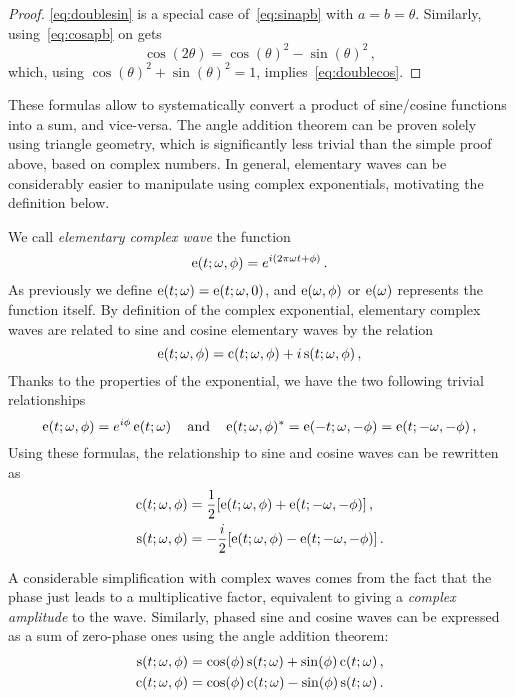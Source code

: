 \begin{proof}
  \cref{eq:doublesin} is a special case of~\cref{eq:sinapb} with $a=b=\theta$. Similarly,
  using~\cref{eq:cosapb} on gets
  \begin{equation}
    \cos(2\theta)=\cos(\theta)^2-\sin(\theta)^2\,,
  \end{equation}
  which, using $\cos(\theta)^2+\sin(\theta)^2=1$, implies~\cref{eq:doublecos}.
\end{proof}
These formulas allow to systematically convert a product of sine/cosine
functions into a sum, and vice-versa. The angle addition theorem can be proven solely
using triangle geometry, which is significantly less trivial than the simple proof above,
based on complex numbers. In general, elementary waves can be considerably easier to manipulate using
complex exponentials, motivating the definition below.
\begin{definition}
  \label{def:complex-wave}
  We call \emph{elementary complex wave} the function
  \begin{equation}
    \operatorname{e}(t;\omega,\phi)=e^{i(2\pi\omega t + \phi)}\,.
  \end{equation}
  As previously we define $\operatorname{e}(t;\omega)=\operatorname{e}(t;\omega,0)$, and $\operatorname{e}(\omega,\phi)$ or
  $\operatorname{e}(\omega)$ represents the function itself. By definition of the complex exponential,
  elementary complex waves are related to sine and cosine elementary waves by the relation
  \begin{equation}
    \operatorname{e}(t;\omega,\phi)=\operatorname{c}(t;\omega,\phi)+i\operatorname{s}(t;\omega,\phi)\,,
  \end{equation}
  Thanks to the properties of the exponential, we have the two following trivial
  relationships
  \begin{equation}
    \operatorname{e}(t;\omega,\phi)=e^{i\phi}\operatorname{e}(t;\omega)\,\quad\text{and}\quad
    \operatorname{e}(t;\omega,\phi)^*=\operatorname{e}(-t;\omega,-\phi)=\operatorname{e}(t;-\omega,-\phi)\,,\label{eq:cw-conj}
  \end{equation}
  Using these formulas, the relationship to sine and cosine waves can be rewritten as
  \begin{align}
    \operatorname{c}(t;\omega,\phi)&=\frac{1}{2}[\operatorname{e}(t;\omega,\phi)+\operatorname{e}(t;-\omega,-\phi)]\,,
    \label{eq:cwtoew}\\
    \operatorname{s}(t;\omega,\phi)&=-\frac{i}{2}[\operatorname{e}(t;\omega,\phi)-\operatorname{e}(t;-\omega,-\phi)]\,.
    \label{eq:swtoew}
  \end{align}
\end{definition}
A considerable simplification with complex waves comes from the fact that the phase just
leads to a multiplicative factor, equivalent to giving a \emph{complex amplitude} to the
wave. Similarly, phased sine and cosine waves can be expressed as a sum of zero-phase ones
using the angle addition theorem:
\begin{align}
  \operatorname{s}(t;\omega,\phi)&=\cos(\phi)\operatorname{s}(t;\omega)+\sin(\phi)\operatorname{c}(t;\omega)\,,\\
  \operatorname{c}(t;\omega,\phi)&=\cos(\phi)\operatorname{c}(t;\omega)-\sin(\phi)\operatorname{s}(t;\omega)\,.
\end{align}
